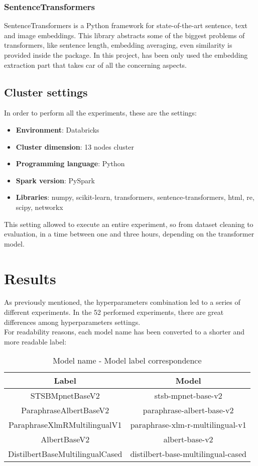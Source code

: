 \documentclass[\main/main.tex]{subfiles}
\begin{document}
\subsubsection{SentenceTransformers}
SentenceTransformers is a Python framework for state-of-the-art sentence, text and image embeddings. This library abstracts some of the biggest problems of transformers, like sentence length, embedding averaging, even similarity is provided inside the package. In this project, has been only used the embedding extraction part that takes car of all the concerning aspects\cite{sentence-transformers}.
\subsection{Cluster settings}
In order to perform all the experiments, these are the settings:
\begin{itemize}
    \item \textbf{Environment}: Databricks
    \item \textbf{Cluster dimension}: 13 nodes cluster
    \item \textbf{Programming language}: Python
    \item \textbf{Spark version}: PySpark
    \item \textbf{Libraries}: numpy, scikit-learn, transformers, sentence-transformers, html, re, scipy, networkx
\end{itemize}
This setting allowed to execute an entire experiment, so from dataset cleaning to evaluation, in a time between one and three hours, depending on the transformer model.

\section{Results}
As previously mentioned, the hyperparameters combination led to a series of different experiments. In the 52 performed experiments, there are great differences among hyperparameters settings.\\
For readability reasons, each model name has been converted to a shorter and more readable label:
\begin{table}[H]
    \centering
    \begin{tabular}{| c | c |}
        \hline
        Label & Model \\ 
        \hline
        STSBMpnetBaseV2 & stsb-mpnet-base-v2     \\
        ParaphraseAlbertBaseV2 & paraphrase-albert-base-v2     \\
        ParaphraseXlmRMultilingualV1 & paraphrase-xlm-r-multilingual-v1     \\
        AlbertBaseV2 & albert-base-v2     \\
        DistilbertBaseMultilingualCased & distilbert-base-multilingual-cased     \\ 
        \hline
    \end{tabular}
    \caption{Model name - Model label correspondence}
    \label{tab:model_name_model_label}
\end{table}
\end{document}
